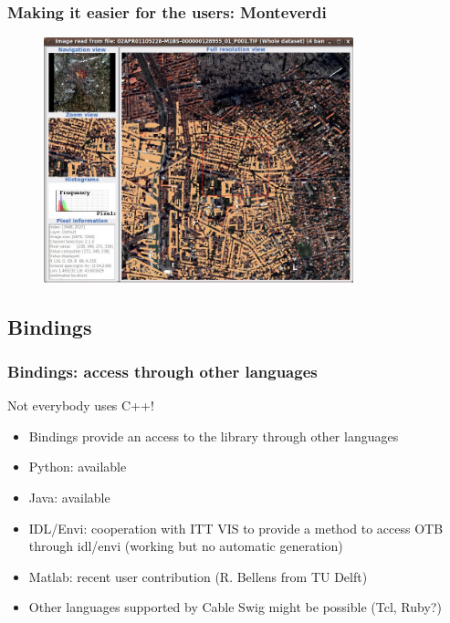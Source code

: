\documentclass[compress]{beamer}
\begin{document}
\begin{frame}
\frametitle{Making it easier for the users: Monteverdi}
\begin{figure}[]
  \includegraphics[width=0.8\textwidth]{monteverdi2.jpg}
\end{figure}
\end{frame}

\subsection{Bindings}
\begin{frame}
\frametitle{Bindings: access through other languages}
\begin{block}{Not everybody uses C++!}
\scriptsize
\begin{itemize}
\item Bindings provide an access to the library through other languages
\item \alert{Python}: available
\item \alert{Java}: available
\item \alert{IDL/Envi}: cooperation with ITT VIS to provide a method
  to access OTB through idl/envi (working but no automatic generation)
  \item \alert{Matlab}: recent user contribution (R. Bellens from TU Delft)
\item Other languages supported by Cable Swig might be possible (Tcl, Ruby?)
\end{itemize}
\end{block}
\end{frame}
\end{document}
